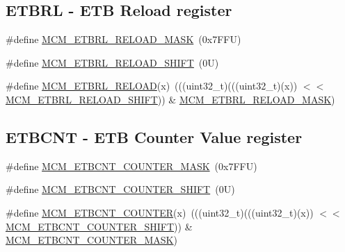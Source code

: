 \subsection*{E\+T\+B\+RL -\/ E\+TB Reload register}
\begin{DoxyCompactItemize}
\item 
\#define \mbox{\hyperlink{group___m_c_m___register___masks_gab63bbd758727921d1744034311a25c81}{M\+C\+M\+\_\+\+E\+T\+B\+R\+L\+\_\+\+R\+E\+L\+O\+A\+D\+\_\+\+M\+A\+SK}}~(0x7\+F\+F\+U)
\item 
\#define \mbox{\hyperlink{group___m_c_m___register___masks_ga04c87446d72a2644f3ee4d493f5febba}{M\+C\+M\+\_\+\+E\+T\+B\+R\+L\+\_\+\+R\+E\+L\+O\+A\+D\+\_\+\+S\+H\+I\+FT}}~(0\+U)
\item 
\#define \mbox{\hyperlink{group___m_c_m___register___masks_ga3aa435178b25a3eb59fa4c76c4276fa4}{M\+C\+M\+\_\+\+E\+T\+B\+R\+L\+\_\+\+R\+E\+L\+O\+AD}}(x)~(((uint32\+\_\+t)(((uint32\+\_\+t)(x)) $<$$<$ \mbox{\hyperlink{group___m_c_m___register___masks_ga04c87446d72a2644f3ee4d493f5febba}{M\+C\+M\+\_\+\+E\+T\+B\+R\+L\+\_\+\+R\+E\+L\+O\+A\+D\+\_\+\+S\+H\+I\+FT}})) \& \mbox{\hyperlink{group___m_c_m___register___masks_gab63bbd758727921d1744034311a25c81}{M\+C\+M\+\_\+\+E\+T\+B\+R\+L\+\_\+\+R\+E\+L\+O\+A\+D\+\_\+\+M\+A\+SK}})
\end{DoxyCompactItemize}
\subsection*{E\+T\+B\+C\+NT -\/ E\+TB Counter Value register}
\begin{DoxyCompactItemize}
\item 
\#define \mbox{\hyperlink{group___m_c_m___register___masks_ga0ad096c8133f83aad1812ed0263a47a7}{M\+C\+M\+\_\+\+E\+T\+B\+C\+N\+T\+\_\+\+C\+O\+U\+N\+T\+E\+R\+\_\+\+M\+A\+SK}}~(0x7\+F\+F\+U)
\item 
\#define \mbox{\hyperlink{group___m_c_m___register___masks_ga6f3bfee5c1a266db914bfcce1b33e40f}{M\+C\+M\+\_\+\+E\+T\+B\+C\+N\+T\+\_\+\+C\+O\+U\+N\+T\+E\+R\+\_\+\+S\+H\+I\+FT}}~(0\+U)
\item 
\#define \mbox{\hyperlink{group___m_c_m___register___masks_ga14675877220745e714191f35ea848ee5}{M\+C\+M\+\_\+\+E\+T\+B\+C\+N\+T\+\_\+\+C\+O\+U\+N\+T\+ER}}(x)~(((uint32\+\_\+t)(((uint32\+\_\+t)(x)) $<$$<$ \mbox{\hyperlink{group___m_c_m___register___masks_ga6f3bfee5c1a266db914bfcce1b33e40f}{M\+C\+M\+\_\+\+E\+T\+B\+C\+N\+T\+\_\+\+C\+O\+U\+N\+T\+E\+R\+\_\+\+S\+H\+I\+FT}})) \& \mbox{\hyperlink{group___m_c_m___register___masks_ga0ad096c8133f83aad1812ed0263a47a7}{M\+C\+M\+\_\+\+E\+T\+B\+C\+N\+T\+\_\+\+C\+O\+U\+N\+T\+E\+R\+\_\+\+M\+A\+SK}})
\end{DoxyCompactItemize}
